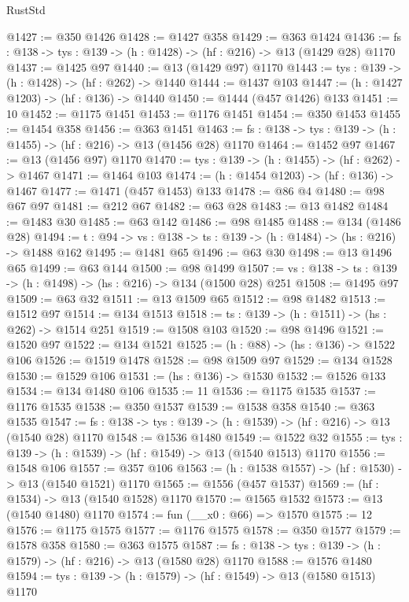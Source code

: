 \begin{lexlean}{RustStd}
\begin{coremodule}
@1427 := @350 @1426
@1428 := @1427 @358
@1429 := @363 @1424
@1436 := {fs : @138} -> {tys : @139} -> (h : @1428) -> (hf : @216) -> @13 (@1429 @28) @1170
@1437 := @1425 @97
@1440 := @13 (@1429 @97) @1170
@1443 := {tys : @139} -> (h : @1428) -> (hf : @262) -> @1440
@1444 := @1437 @103
@1447 := (h : @1427 @1203) -> (hf : @136) -> @1440
@1450 := @1444 (@457 @1426) @133
@1451 := 10
@1452 := @1175 @1451
@1453 := @1176 @1451
@1454 := @350 @1453
@1455 := @1454 @358
@1456 := @363 @1451
@1463 := {fs : @138} -> {tys : @139} -> (h : @1455) -> (hf : @216) -> @13 (@1456 @28) @1170
@1464 := @1452 @97
@1467 := @13 (@1456 @97) @1170
@1470 := {tys : @139} -> (h : @1455) -> (hf : @262) -> @1467
@1471 := @1464 @103
@1474 := (h : @1454 @1203) -> (hf : @136) -> @1467
@1477 := @1471 (@457 @1453) @133
@1478 := @86 @4
@1480 := @98 @67 @97
@1481 := @212 @67
@1482 := @63 @28
@1483 := @13 @1482
@1484 := @1483 @30
@1485 := @63 @142
@1486 := @98 @1485
@1488 := @134 (@1486 @28)
@1494 := {t : @94} -> {vs : @138} -> {ts : @139} -> (h : @1484) -> (hs : @216) -> @1488 @162
@1495 := @1481 @65
@1496 := @63 @30
@1498 := @13 @1496 @65
@1499 := @63 @144
@1500 := @98 @1499
@1507 := {vs : @138} -> {ts : @139} -> (h : @1498) -> (hs : @216) -> @134 (@1500 @28) @251
@1508 := @1495 @97
@1509 := @63 @32
@1511 := @13 @1509 @65
@1512 := @98 @1482
@1513 := @1512 @97
@1514 := @134 @1513
@1518 := {ts : @139} -> (h : @1511) -> (hs : @262) -> @1514 @251
@1519 := @1508 @103
@1520 := @98 @1496
@1521 := @1520 @97
@1522 := @134 @1521
@1525 := (h : @88) -> (hs : @136) -> @1522 @106
@1526 := @1519 @1478
@1528 := @98 @1509 @97
@1529 := @134 @1528
@1530 := @1529 @106
@1531 := (hs : @136) -> @1530
@1532 := @1526 @133
@1534 := @134 @1480 @106
@1535 := 11
@1536 := @1175 @1535
@1537 := @1176 @1535
@1538 := @350 @1537
@1539 := @1538 @358
@1540 := @363 @1535
@1547 := {fs : @138} -> {tys : @139} -> (h : @1539) -> (hf : @216) -> @13 (@1540 @28) @1170
@1548 := @1536 @1480
@1549 := @1522 @32
@1555 := {tys : @139} -> (h : @1539) -> (hf : @1549) -> @13 (@1540 @1513) @1170
@1556 := @1548 @106
@1557 := @357 @106
@1563 := (h : @1538 @1557) -> (hf : @1530) -> @13 (@1540 @1521) @1170
@1565 := @1556 (@457 @1537)
@1569 := (hf : @1534) -> @13 (@1540 @1528) @1170
@1570 := @1565 @1532
@1573 := @13 (@1540 @1480) @1170
@1574 := fun (__x0 : @66) => @1570
@1575 := 12
@1576 := @1175 @1575
@1577 := @1176 @1575
@1578 := @350 @1577
@1579 := @1578 @358
@1580 := @363 @1575
@1587 := {fs : @138} -> {tys : @139} -> (h : @1579) -> (hf : @216) -> @13 (@1580 @28) @1170
@1588 := @1576 @1480
@1594 := {tys : @139} -> (h : @1579) -> (hf : @1549) -> @13 (@1580 @1513) @1170

\end{coremodule}
\end{lexlean}
